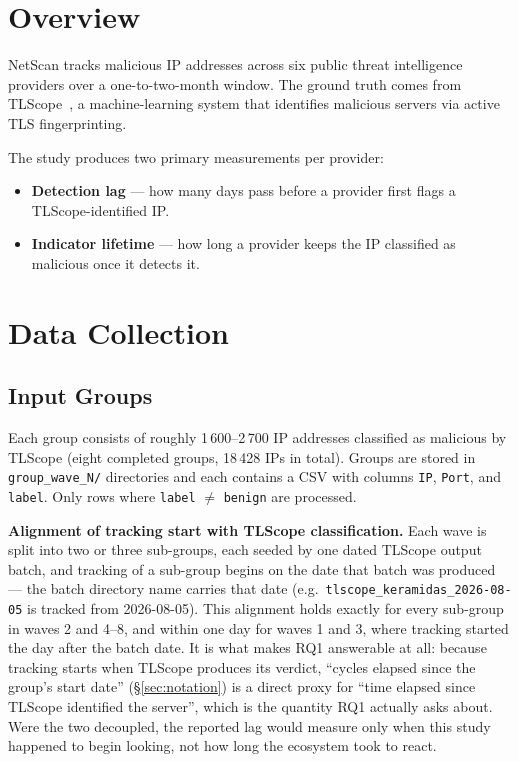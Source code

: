 \documentclass[12pt, a4paper, twoside]{report}
\begin{document}
\section{Overview}

NetScan tracks malicious IP addresses across six public threat intelligence providers over a
one-to-two-month window. The ground truth comes from TLScope~\cite{theofanous2024tlscope}, a
machine-learning system that identifies malicious servers via active TLS fingerprinting.

The study produces two primary measurements per provider:
\begin{itemize}
  \item \textbf{Detection lag} --- how many days pass before a provider first flags a
    TLScope-identified IP.
  \item \textbf{Indicator lifetime} --- how long a provider keeps the IP classified as malicious
    once it detects it.
\end{itemize}

\section{Data Collection}

\subsection{Input Groups}

Each group consists of roughly 1\,600--2\,700 IP addresses classified as malicious by TLScope
(eight completed groups, 18\,428 IPs in total). Groups are stored in \texttt{group\_wave\_N/}
directories and each contains a CSV with columns \texttt{IP}, \texttt{Port}, and \texttt{label}.
Only rows where \texttt{label} $\neq$ \texttt{benign} are processed.

\textbf{Alignment of tracking start with TLScope classification.} Each wave is split into two or
three sub-groups, each seeded by one dated TLScope output batch, and tracking of a sub-group begins
on the date that batch was produced --- the batch directory name carries that date (e.g.\
\texttt{tlscope\_keramidas\_2026-08-05} is tracked from 2026-08-05). This alignment holds exactly
for every sub-group in waves 2 and 4--8, and within one day for waves 1 and 3, where tracking
started the day after the batch date. It is what makes RQ1 answerable at all: because tracking
starts when TLScope produces its verdict, ``cycles elapsed since the group's start date''
(\S\ref{sec:notation}) is a direct proxy for ``time elapsed since TLScope identified the server'',
which is the quantity RQ1 actually asks about. Were the two decoupled, the reported lag would
measure only when this study happened to begin looking, not how long the ecosystem took to react.
\end{document}
